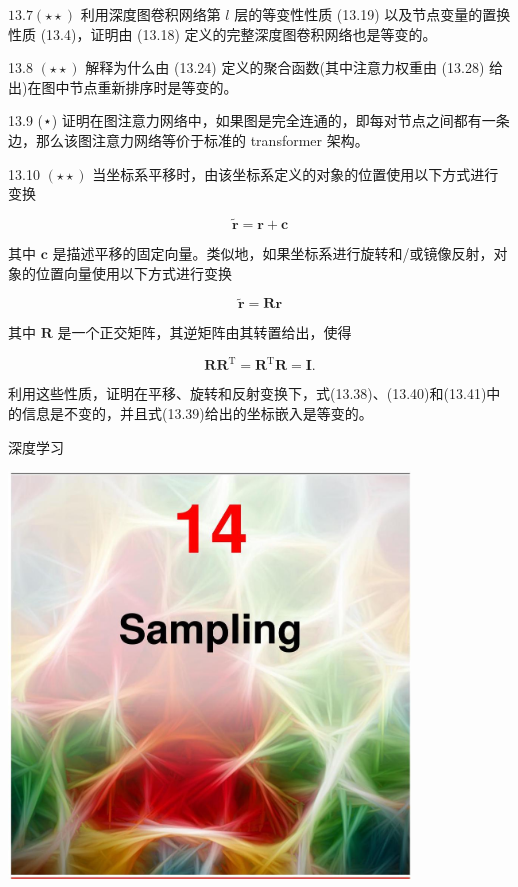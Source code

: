 \documentclass[10pt]{report}
\begin{document}
\({13.7}\left( {\star  \star  }\right)\) 利用深度图卷积网络第 \(l\) 层的等变性性质 (13.19) 以及节点变量的置换性质 (13.4)，证明由 (13.18) 定义的完整深度图卷积网络也是等变的。

13.8 \(\left( {\star  \star  }\right)\) 解释为什么由 (13.24) 定义的聚合函数(其中注意力权重由 (13.28) 给出)在图中节点重新排序时是等变的。

13.9 (⋆) 证明在图注意力网络中，如果图是完全连通的，即每对节点之间都有一条边，那么该图注意力网络等价于标准的 transformer 架构。

13.10 \(\left( {\star  \star  }\right)\) 当坐标系平移时，由该坐标系定义的对象的位置使用以下方式进行变换

\[
\widetilde{\mathbf{r}} = \mathbf{r} + \mathbf{c} \tag{13.45}
\]

其中 \(\mathbf{c}\) 是描述平移的固定向量。类似地，如果坐标系进行旋转和/或镜像反射，对象的位置向量使用以下方式进行变换

\[
\widetilde{\mathbf{r}} = \mathbf{{Rr}} \tag{13.46}
\]

其中 \(\mathbf{R}\) 是一个正交矩阵，其逆矩阵由其转置给出，使得

\[
\mathbf{R}{\mathbf{R}}^{\mathrm{T}} = {\mathbf{R}}^{\mathrm{T}}\mathbf{R} = \mathbf{I}. \tag{13.47}
\]

利用这些性质，证明在平移、旋转和反射变换下，式(13.38)、(13.40)和(13.41)中的信息是不变的，并且式(13.39)给出的坐标嵌入是等变的。

深度学习

\begin{center}
\includegraphics[max width=0.8\textwidth]{images/0194e279-9b28-703a-88f4-c3ac21e2010d_448_474_351_1074_1085_0.jpg}
\end{center}
\hspace*{3em} 
\end{document}
